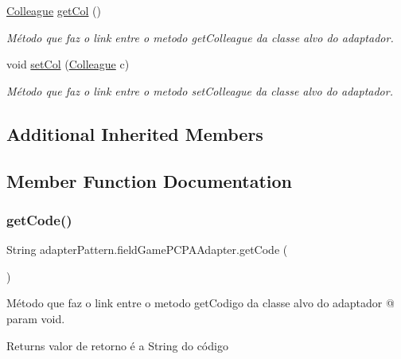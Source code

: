 \begin{DoxyCompactItemize}
\mbox{\hyperlink{classmediator_pattern_1_1_colleague}{Colleague}} \mbox{\hyperlink{classadapter_pattern_1_1field_game_p_c_p_a_adapter_a3ecb2186e522338f6d1530d4c365581b}{get\+Col}} ()
\begin{DoxyCompactList}\small\item\em Método que faz o link entre o metodo get\+Colleague da classe alvo do adaptador. \end{DoxyCompactList}\item 
void \mbox{\hyperlink{classadapter_pattern_1_1field_game_p_c_p_a_adapter_a3fd416ee138bfbce32b5541ffd651bfc}{set\+Col}} (\mbox{\hyperlink{classmediator_pattern_1_1_colleague}{Colleague}} c)
\begin{DoxyCompactList}\small\item\em Método que faz o link entre o metodo set\+Colleague da classe alvo do adaptador. \end{DoxyCompactList}\end{DoxyCompactItemize}
\subsection*{Additional Inherited Members}


\subsection{Member Function Documentation}
\mbox{\label{classadapter_pattern_1_1field_game_p_c_p_a_adapter_affcab1e10cb84628421d756b5660bb69}} 
\subsubsection{\texorpdfstring{getCode()}{getCode()}}
{\footnotesize\ttfamily String adapter\+Pattern.\+field\+Game\+P\+C\+P\+A\+Adapter.\+get\+Code (\begin{DoxyParamCaption}{ }\end{DoxyParamCaption})}



Método que faz o link entre o metodo get\+Codigo da classe alvo do adaptador @ param void. 

\begin{DoxyReturn}{Returns}
valor de retorno é a String do código 
\end{DoxyReturn}


